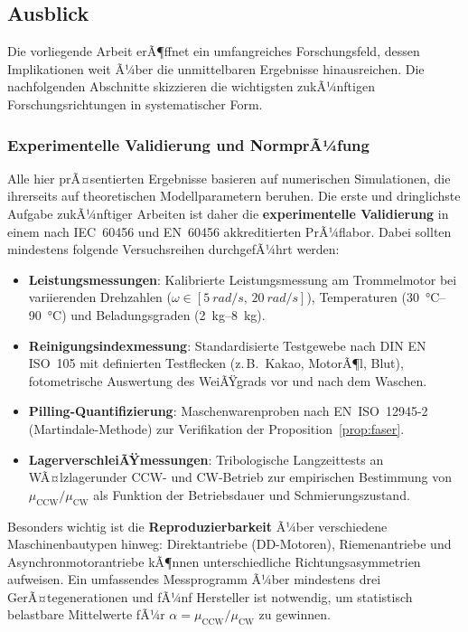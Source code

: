 ﻿\documentclass[12pt,a4paper]{article}
\theoremstyle{remark}
\newcommand{\CCW}{\mathrm{CCW}}
\newcommand{\CW}{\mathrm{CW}}
\begin{document}
	\subsection{Ausblick}
	
	Die vorliegende Arbeit erÃ¶ffnet ein umfangreiches Forschungsfeld, dessen Implikationen
	weit Ã¼ber die unmittelbaren Ergebnisse hinausreichen. Die nachfolgenden Abschnitte
	skizzieren die wichtigsten zukÃ¼nftigen Forschungsrichtungen in systematischer Form.
	
	\subsubsection{Experimentelle Validierung und NormprÃ¼fung}
	
	Alle hier prÃ¤sentierten Ergebnisse basieren auf numerischen Simulationen, die ihrerseits
	auf theoretischen Modellparametern beruhen. Die erste und dringlichste Aufgabe
	zukÃ¼nftiger Arbeiten ist daher die \textbf{experimentelle Validierung} in einem nach
	IEC~60456 und EN~60456 akkreditierten PrÃ¼flabor. Dabei sollten mindestens folgende
	Versuchsreihen durchgefÃ¼hrt werden:
	
	\begin{itemize}
		\item \textbf{Leistungsmessungen}: Kalibrierte Leistungsmessung am Trommelmotor bei
		variierenden Drehzahlen ($\omega \in [\SI{5}{rad/s},\,\SI{20}{rad/s}]$), Temperaturen
		(\SI{30}{\celsius}--\SI{90}{\celsius}) und Beladungsgraden (\SI{2}{kg}--\SI{8}{kg}).
		\item \textbf{Reinigungsindexmessung}: Standardisierte Testgewebe nach DIN EN ISO~105
		mit definierten Testflecken (z.\,B.\ Kakao, MotorÃ¶l, Blut), fotometrische Auswertung
		des WeiÃŸgrads vor und nach dem Waschen.
		\item \textbf{Pilling-Quantifizierung}: Maschenwarenproben nach EN~ISO~12945-2
		(Martindale-Methode) zur Verifikation der Proposition~\ref{prop:faser}.
		\item \textbf{LagerverschleiÃŸmessungen}: Tribologische Langzeittests an WÃ¤lzlager\-under
		CCW- und CW-Betrieb zur empirischen Bestimmung von $\mu_{\CCW}/\mu_{\CW}$ als
		Funktion der Betriebsdauer und Schmierungszustand.
	\end{itemize}
	
	Besonders wichtig ist die \textbf{Reproduzierbarkeit} Ã¼ber verschiedene
	Maschinenbautypen hinweg: Direktantriebe (DD-Motoren), Riemenantriebe und
	Asynchronmotorantriebe kÃ¶nnen unterschiedliche Richtungsasymmetrien aufweisen.
	Ein umfassendes Messprogramm Ã¼ber mindestens drei GerÃ¤tegenerationen und fÃ¼nf
	Hersteller ist notwendig, um statistisch belastbare Mittelwerte fÃ¼r $\alpha = \mu_{\CCW}/\mu_{\CW}$
	zu gewinnen.
	
\end{document}
